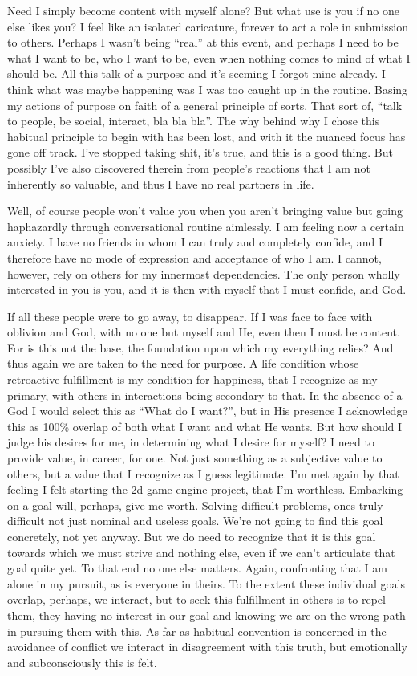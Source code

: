 \qquad Need I simply become content with myself alone? But what use is
you if no one else likes you? I feel like an isolated caricature,
forever to act a role in submission to others. Perhaps I wasn't being
``real'' at this event, and perhaps I need to be what I want to be, who
I want to be, even when nothing comes to mind of what I should be. All
this talk of a purpose and it's seeming I forgot mine already. I think
what was maybe happening was I was too caught up in the routine. Basing
my actions of purpose on faith of a general principle of sorts. That
sort of, ``talk to people, be social, interact, bla bla bla''. The why
behind why I chose this habitual principle to begin with has been lost,
and with it the nuanced focus has gone off track. I've stopped taking
shit, it's true, and this is a good thing. But possibly I've also
discovered therein from people's reactions that I am not inherently so
valuable, and thus I have no real partners in life.

\qquad Well, of course people won't value you when you aren't bringing
value but going haphazardly through conversational routine aimlessly. I
am feeling now a certain anxiety. I have no friends in whom I can truly
and completely confide, and I therefore have no mode of expression and
acceptance of who I am. I cannot, however, rely on others for my
innermost dependencies. The only person wholly interested in you is you,
and it is then with myself that I must confide, and God.

\qquad If all these people were to go away, to disappear. If I was face
to face with oblivion and God, with no one but myself and He, even then
I must be content. For is this not the base, the foundation upon which
my everything relies? And thus again we are taken to the need for
purpose. A life condition whose retroactive fulfillment is my condition
for happiness, that I recognize as my primary, with others in
interactions being secondary to that. In the absence of a God I would
select this as ``What do I want?'', but in His presence I acknowledge
this as 100\% overlap of both what I want and what He wants. But how
should I judge his desires for me, in determining what I desire for
myself? I need to provide value, in career, for one. Not just something
as a subjective value to others, but a value that I recognize as I guess
legitimate. I'm met again by that feeling I felt starting the 2d game
engine project, that I'm worthless. Embarking on a goal will, perhaps,
give me worth. Solving difficult problems, ones truly difficult not just
nominal and useless goals. We're not going to find this goal concretely,
not yet anyway. But we do need to recognize that it is this goal towards
which we must strive and nothing else, even if we can't articulate that
goal quite yet. To that end no one else matters. Again, confronting that
I am alone in my pursuit, as is everyone in theirs. To the extent these
individual goals overlap, perhaps, we interact, but to seek this
fulfillment in others is to repel them, they having no interest in our
goal and knowing we are on the wrong path in pursuing them with this. As
far as habitual convention is concerned in the avoidance of conflict we
interact in disagreement with this truth, but emotionally and
subconsciously this is felt.

